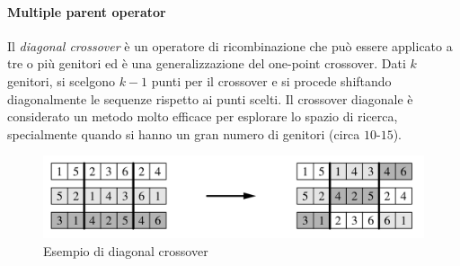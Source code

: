\paragraph{Multiple parent operator}
Il \textit{diagonal crossover} è un operatore di ricombinazione che può essere applicato a tre o più genitori ed è una generalizzazione del one-point crossover. Dati $k$ genitori, si scelgono $k-1$ punti per il crossover e si procede shiftando diagonalmente le sequenze rispetto ai punti scelti. Il crossover diagonale è considerato un metodo molto efficace per esplorare lo spazio di ricerca, specialmente quando si hanno un gran numero di genitori (circa $10$-$15$).
\begin{figure}[h]
    \centering
    \includegraphics[scale=0.35]{images/diagonal-crossover.png}
    \caption{Esempio di diagonal crossover}
\end{figure}

